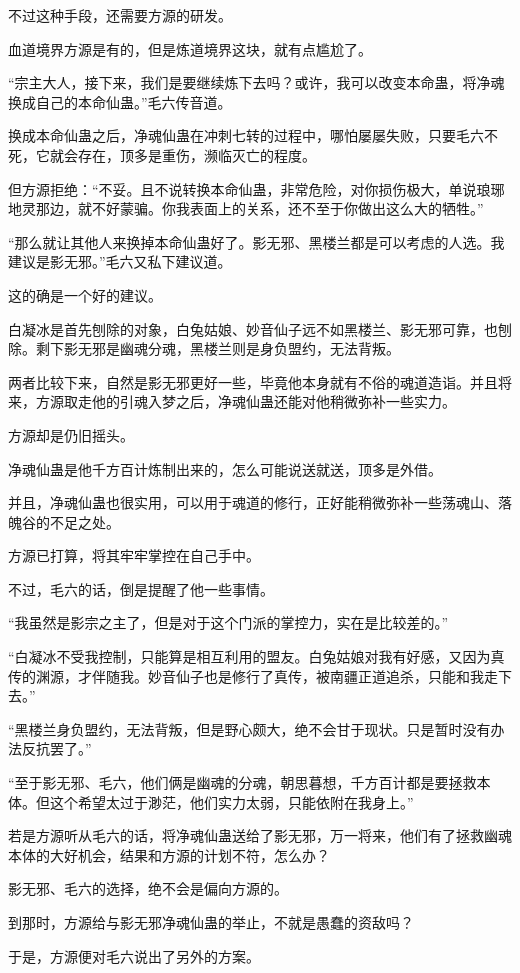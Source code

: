 \begin{this_body}
不过这种手段，还需要方源的研发。

血道境界方源是有的，但是炼道境界这块，就有点尴尬了。

“宗主大人，接下来，我们是要继续炼下去吗？或许，我可以改变本命蛊，将净魂换成自己的本命仙蛊。”毛六传音道。

换成本命仙蛊之后，净魂仙蛊在冲刺七转的过程中，哪怕屡屡失败，只要毛六不死，它就会存在，顶多是重伤，濒临灭亡的程度。

但方源拒绝：“不妥。且不说转换本命仙蛊，非常危险，对你损伤极大，单说琅琊地灵那边，就不好蒙骗。你我表面上的关系，还不至于你做出这么大的牺牲。”

“那么就让其他人来换掉本命仙蛊好了。影无邪、黑楼兰都是可以考虑的人选。我建议是影无邪。”毛六又私下建议道。

这的确是一个好的建议。

白凝冰是首先刨除的对象，白兔姑娘、妙音仙子远不如黑楼兰、影无邪可靠，也刨除。剩下影无邪是幽魂分魂，黑楼兰则是身负盟约，无法背叛。

两者比较下来，自然是影无邪更好一些，毕竟他本身就有不俗的魂道造诣。并且将来，方源取走他的引魂入梦之后，净魂仙蛊还能对他稍微弥补一些实力。

方源却是仍旧摇头。

净魂仙蛊是他千方百计炼制出来的，怎么可能说送就送，顶多是外借。

并且，净魂仙蛊也很实用，可以用于魂道的修行，正好能稍微弥补一些荡魂山、落魄谷的不足之处。

方源已打算，将其牢牢掌控在自己手中。

不过，毛六的话，倒是提醒了他一些事情。

“我虽然是影宗之主了，但是对于这个门派的掌控力，实在是比较差的。”

“白凝冰不受我控制，只能算是相互利用的盟友。白兔姑娘对我有好感，又因为真传的渊源，才伴随我。妙音仙子也是修行了真传，被南疆正道追杀，只能和我走下去。”

“黑楼兰身负盟约，无法背叛，但是野心颇大，绝不会甘于现状。只是暂时没有办法反抗罢了。”

“至于影无邪、毛六，他们俩是幽魂的分魂，朝思暮想，千方百计都是要拯救本体。但这个希望太过于渺茫，他们实力太弱，只能依附在我身上。”

若是方源听从毛六的话，将净魂仙蛊送给了影无邪，万一将来，他们有了拯救幽魂本体的大好机会，结果和方源的计划不符，怎么办？

影无邪、毛六的选择，绝不会是偏向方源的。

到那时，方源给与影无邪净魂仙蛊的举止，不就是愚蠢的资敌吗？

于是，方源便对毛六说出了另外的方案。


\end{this_body}
